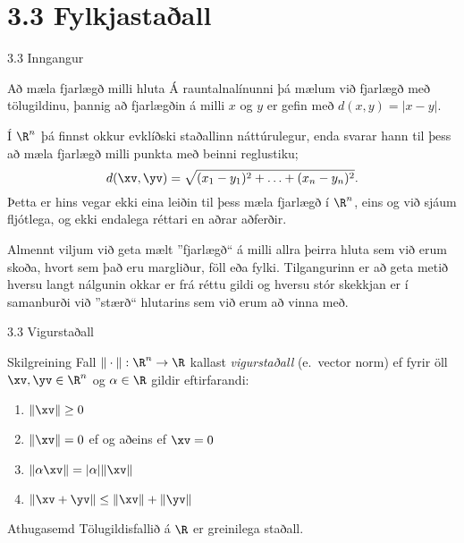 
\section*{3.3 Fylkjastaðall}

\begin{frame}{3.3 Inngangur}
 \begin{block}{Að mæla fjarlægð milli hluta}
    Á rauntalnalínunni þá mælum við fjarlægð með tölugildinu,
    þannig að fjarlægðin á milli $x$ og $y$ er gefin með
    $d(x,y)=|x-y|$. 

\pause\smallskip

  Í $\R^n$ þá finnst okkur evklíðski staðallinn náttúrulegur, enda svarar  
  hann til þess að mæla fjarlægð milli punkta með beinni reglustiku;
  $$
    d(\xv,\yv) = \sqrt{ (x_1-y_1)^2 + \ldots + (x_n-y_n)^2 }.
  $$\pause
  Þetta er hins vegar ekki eina leiðin til þess mæla fjarlægð
í $\R^n$, eins og við sjáum fljótlega, og ekki endalega réttari 
en aðrar aðferðir.

\pause\smallskip
  
  Almennt viljum við geta mælt ''fjarlægð`` á milli allra þeirra hluta
sem við erum skoða, hvort sem það eru margliður, föll eða fylki.
Tilgangurinn er að geta metið hversu langt nálgunin okkar er frá
réttu gildi og hversu stór skekkjan er í samanburði við ''stærð``
hlutarins sem við erum að vinna með.

 \end{block}
\end{frame}


\begin{frame}{3.3 Vigurstaðall}
 
\begin{block}{Skilgreining}
 Fall $\| \cdot\|:\R^n \to \R$ kallast \emph{vigurstaðall} (e.~vector norm)
ef fyrir öll $\xv,\yv\in \R^n$ og $\alpha \in \R$ gildir eftirfarandi:\pause
\begin{enumerate}
 \item $\|\xv\| \geq 0$\pause
 \item $\|\xv\| = 0$ ef og aðeins ef $\xv = 0$\pause
 \item $\|\alpha\xv\| = |\alpha|\|\xv\|$\pause
 \item $\|\xv+\yv\| \leq \|\xv\| + \|\yv\|$
\end{enumerate}
\end{block}

\pause

\begin{block}{Athugasemd}
 Tölugildisfallið á $\R$ er greinilega staðall. 
\end{block}
\end{frame}

